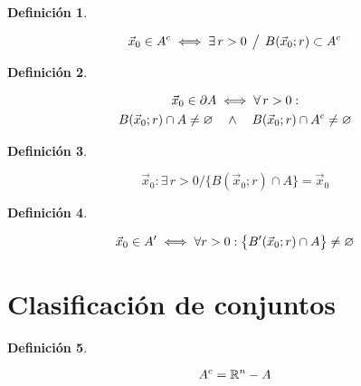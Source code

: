 \documentclass[a5paper,12pt,twoside]{book}
\newtheorem{defn}{{Definición}}[chapter]
\begin{document}
\begin{mdframed}[style=MyFrame1]
    \begin{defn}
    \end{defn}
    \begin{equation*}
        \Vec{x}_0 \in A^c \iff \exists \, r>0 \hspace{1ex} \big/ \hspace{1ex} B(\Vec{x}_0;r) \subset A^c
    \end{equation*}
\end{mdframed}

\begin{mdframed}[style=MyFrame1]
    \begin{defn}
    \end{defn}
    \begin{multline*}
        \Vec{x}_0 \in \partial A \iff \forall \, r>0 : \\ B(\Vec{x}_0;r) \cap A \neq \varnothing \quad \land \quad B(\Vec{x}_0;r) \cap A^c \neq \varnothing
    \end{multline*}
\end{mdframed}

\begin{mdframed}[style=MyFrame1]
    \begin{defn}
    \end{defn}
    \begin{equation*}
        \Vec{x}_0 : \exists \, r>0 / \big\{ B(\Vec{x}_0;r) \cap A \big\} = \Vec{x}_0
    \end{equation*}
\end{mdframed}

\begin{mdframed}[style=MyFrame1]
    \begin{defn}
        \label{defn:limitPoint}
    \end{defn}
    \begin{equation*}
        \Vec{x}_0 \in A' \iff \forall r>0 : \big\{ B'(\Vec{x}_0;r) \cap A \big\} \neq \varnothing
    \end{equation*}
\end{mdframed}


\section{Clasificación de conjuntos}

\begin{mdframed}[style=MyFrame1]
    \begin{defn}
    \end{defn}
    \begin{equation*}
        A^c = \mathbb{R}^n - A
    \end{equation*}
\end{mdframed}
\end{document}
